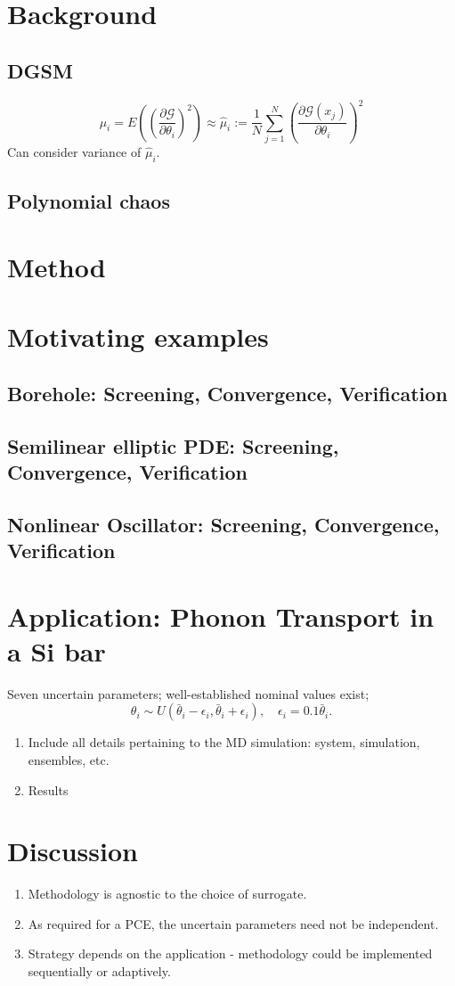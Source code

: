 \documentclass[letter,12pt]{article}
\begin{document}
\section{Background}
\subsection{DGSM}
\[ 
    \mu_i = E\left(\left( \frac{\partial \mathcal{G}}{\partial \theta_i}\right)^2\right)
          \approx \hat\mu_i := \frac1N\sum_{j = 1}^N 
                  \left(\frac{\partial \mathcal{G}(x_j)}{\partial \theta_i}\right)^2
\]
Can consider variance of $\hat\mu_i$.

\subsection{Polynomial chaos}
\section{Method}

\section{Motivating examples}
\subsection{Borehole: Screening, Convergence, Verification}
\subsection{Semilinear elliptic PDE: Screening, Convergence, Verification}
\subsection{Nonlinear Oscillator: Screening, Convergence, Verification}

\section{Application: Phonon Transport in a Si bar}

Seven uncertain parameters; well-established nominal values exist;
\[
   \theta_i \sim U(\bar\theta_i - \epsilon_i, \bar\theta_i + \epsilon_i), 
   \quad \epsilon_i = 0.1 \bar\theta_i. 
\]
\begin{enumerate}
\item Include all details pertaining to the MD simulation: system, simulation, 
ensembles, etc. 
\item Results
\end{enumerate}

\section{Discussion}
\begin{enumerate}
\item Methodology is agnostic to the choice of surrogate.
\item As required for a PCE, the uncertain parameters need not be independent. 
\item Strategy depends on the application - methodology could be implemented 
sequentially or adaptively. 
\end{enumerate}
\end{document}
